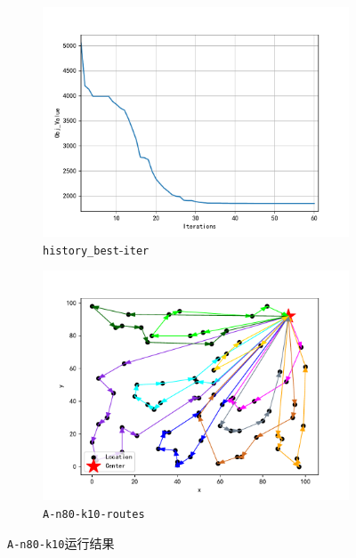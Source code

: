 \documentclass{nudt}
\begin{document}
\begin{figure}[H]
	\centering
	\begin{subfigure}{0.475\linewidth}
		\centering
		\includegraphics[height=0.85\linewidth]{image/A-n80-k10iter.pdf}
		\caption{\texttt{history\_best}-\texttt{iter}}
		\label{fig:A-n80-k10iter}%
	\end{subfigure}
	\centering
	\begin{subfigure}{0.475\linewidth}
		\centering
		\includegraphics[height=0.85\linewidth]{image/A-n80-k10routes.pdf}
		\caption{\texttt{A-n80-k10-routes}}
		\label{fig:A-n80-k10routes}%
	\end{subfigure}
	\caption{\texttt{A-n80-k10}运行结果}
	\label{fig:A-n80-k10}
\end{figure}
\end{document}
